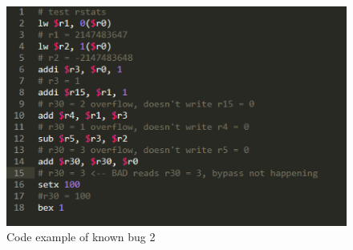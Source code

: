 \documentclass[letterpaper]{article}
\begin{document}
\begin{figure}[h]
    \centering
    \includegraphics[width=\textwidth]{nobypassrstatus.png}
    \caption{Code example of known bug 2}
    \label{fig:my_label}
\end{figure}
\end{document}
